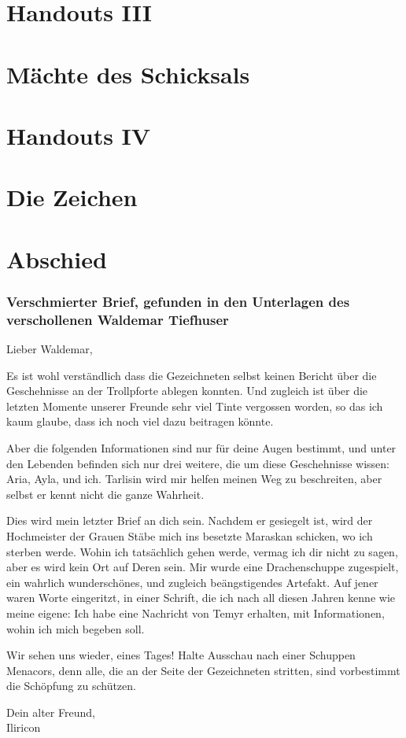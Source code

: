 \documentclass[10pt,twoside,twocolumn,openany,hidelinks]{book}
\begin{document}
\part*{Handouts III}


\part{Mächte des Schicksals}


\part*{Handouts IV}


\part{Die Zeichen}





\part{Abschied}

\section{Verschmierter Brief, gefunden in den Unterlagen des verschollenen Waldemar Tiefhuser}

Lieber Waldemar,

Es ist wohl verständlich dass die Gezeichneten selbst keinen Bericht über die Geschehnisse an der Trollpforte ablegen konnten.
Und zugleich ist über die letzten Momente unserer Freunde sehr viel Tinte vergossen worden, so das ich kaum glaube, dass ich noch viel dazu beitragen könnte.

Aber die folgenden Informationen sind nur für deine Augen bestimmt, und unter den Lebenden befinden sich nur drei weitere, die um diese Geschehnisse wissen: Aria, Ayla, und ich. Tarlisin wird mir helfen meinen Weg zu beschreiten, aber selbst er kennt nicht die ganze Wahrheit.

Dies wird mein letzter Brief an dich sein. Nachdem er gesiegelt ist, wird der Hochmeister der Grauen Stäbe mich ins besetzte Maraskan schicken, wo ich sterben werde.
Wohin ich tatsächlich gehen werde, vermag ich dir nicht zu sagen, aber es wird kein Ort auf Deren sein.
Mir wurde eine Drachenschuppe zugespielt, ein wahrlich wunderschönes, und zugleich beängstigendes Artefakt.
Auf jener waren Worte eingeritzt, in einer Schrift, die ich nach all diesen Jahren kenne wie meine eigene: Ich habe eine Nachricht von Temyr erhalten, mit Informationen, wohin ich mich begeben soll.

Wir sehen uns wieder, eines Tages! Halte Ausschau nach einer Schuppen Menacors, denn alle, die an der Seite der Gezeichneten stritten, sind vorbestimmt die Schöpfung zu schützen.

Dein alter Freund,\\
Iliricon
\end{document}
